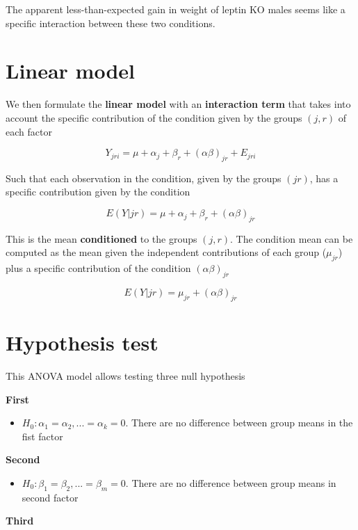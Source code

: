 \documentclass[
]{book}
\providecommand{\tightlist}{%
  \setlength{\itemsep}{0pt}\setlength{\parskip}{0pt}}
\begin{document}
The apparent less-than-expected gain in weight of leptin KO males seems like a specific interaction between these two conditions.

\hypertarget{linear-model-2}{%
\section{Linear model}\label{linear-model-2}}

We then formulate the \textbf{linear model} with an \textbf{interaction term} that takes into account the specific contribution of the condition given by the groups \((j,r)\) of each factor

\[Y_{jri} = \mu + \alpha_j + \beta_r + (\alpha\beta)_{jr} + E_{jri}\]

Such that each observation in the condition, given by the groups \((jr)\), has a specific contribution given by the condition

\[E(Y|jr)=\mu + \alpha_j+ \beta_r + (\alpha\beta)_{jr}\]

This is the mean \textbf{conditioned} to the groups \((j,r)\). The condition mean can be computed as the mean given the independent contributions of each group (\(\mu_{jr}\)) plus a specific contribution of the condition \((\alpha\beta)_{jr}\)

\[E(Y|jr)=\mu_{jr}  + (\alpha\beta)_{jr}\]

\hypertarget{hypothesis-test-4}{%
\section{Hypothesis test}\label{hypothesis-test-4}}

This ANOVA model allows testing three null hypothesis

\textbf{First}

\begin{itemize}
\tightlist
\item
  \(H_0: \alpha_1=\alpha_2, ...=\alpha_k=0\). There are no difference between group means in the fist factor
\end{itemize}

\textbf{Second}

\begin{itemize}
\tightlist
\item
  \(H_0: \beta_1=\beta_2, ...=\beta_m=0\). There are no difference between group means in second factor
\end{itemize}

\textbf{Third}
\end{document}
